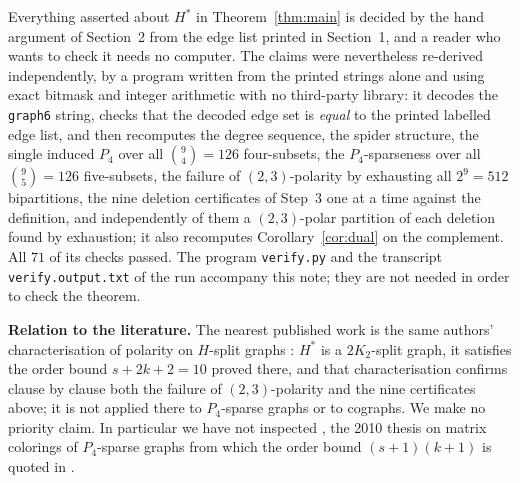 \documentclass[11pt]{amsart}
\theoremstyle{definition}
\theoremstyle{remark}
\newcommand{\Hstar}{H^{*}}
\begin{document}
Everything asserted about $\Hstar$ in Theorem~\ref{thm:main} is decided by the hand argument of
Section~2 from the edge list printed in Section~1, and a reader who wants to check it needs no
computer. The claims were nevertheless re-derived independently, by a program written from the
printed strings alone and using exact bitmask and integer arithmetic with no third-party
library: it decodes the \texttt{graph6} string, checks that the decoded edge set is
\emph{equal} to the printed labelled edge list, and then recomputes the degree sequence, the
spider structure, the single induced $P_4$ over all $\binom94=126$ four-subsets, the
$P_4$-sparseness over all $\binom95=126$ five-subsets, the failure of $(2,3)$-polarity by
exhausting all $2^9=512$ bipartitions, the nine deletion certificates of Step~3 one at a time
against the definition, and independently of them a $(2,3)$-polar partition of each deletion
found by exhaustion; it also recomputes Corollary~\ref{cor:dual} on the complement. All $71$ of
its checks passed. The program \texttt{verify.py} and the transcript
\texttt{verify.output.txt} of the run accompany this note; they are not needed in order to
check the theorem.

\medskip
\noindent\textbf{Relation to the literature.}
The nearest published work is the same authors' characterisation of polarity on $H$-split
graphs \cite{CMHCsplit}: $\Hstar$ is a $2K_2$-split graph, it satisfies the order bound
$s+2k+2=10$ proved there, and that characterisation confirms clause by clause both the failure
of $(2,3)$-polarity and the nine certificates above; it is not applied there to $P_4$-sparse
graphs or to cographs. We make no priority claim. In particular we have not inspected
\cite{Hannebauer}, the 2010 thesis on matrix colorings of $P_4$-sparse graphs from which the
order bound $(s+1)(k+1)$ is quoted in \cite{CMHC24}.
\end{document}
